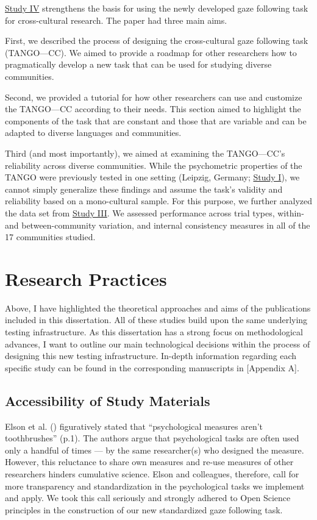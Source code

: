 \documentclass[
]{scrbook}
\begin{document}
\hyperref[studyIV]{Study IV} strengthens the basis for using the newly developed gaze following task for cross-cultural research. The paper had three main aims.

First, we described the process of designing the cross-cultural gaze following task (TANGO---CC). We aimed to provide a roadmap for other researchers how to pragmatically develop a new task that can be used for studying diverse communities.

Second, we provided a tutorial for how other researchers can use and customize the TANGO---CC according to their needs. This section aimed to highlight the components of the task that are constant and those that are variable and can be adapted to diverse languages and communities.

Third (and most importantly), we aimed at examining the TANGO---CC's reliability across diverse communities. While the psychometric properties of the TANGO were previously tested in one setting (Leipzig, Germany; \hyperref[studyI]{Study I}), we cannot simply generalize these findings and assume the task's validity and reliability based on a mono-cultural sample. For this purpose, we further analyzed the data set from \hyperref[studyIII]{Study III}. We assessed performance across trial types, within- and between-community variation, and internal consistency measures in all of the 17 communities studied.

\section{Research Practices}\label{research-practices}

Above, I have highlighted the theoretical approaches and aims of the publications included in this dissertation. All of these studies build upon the same underlying testing infrastructure. As this dissertation has a strong focus on methodological advances, I want to outline our main technological decisions within the process of designing this new testing infrastructure. In-depth information regarding each specific study can be found in the corresponding manuscripts in {[}Appendix A{]}.

\subsection{Accessibility of Study Materials}\label{accessibility-of-study-materials}

Elson et al. () figuratively stated that ``psychological measures aren't toothbrushes'' (p.1). The authors argue that psychological tasks are often used only a handful of times --- by the same researcher(s) who designed the measure. However, this reluctance to share own measures and re-use measures of other researchers hinders cumulative science. Elson and colleagues, therefore, call for more transparency and standardization in the psychological tasks we implement and apply. We took this call seriously and strongly adhered to Open Science principles in the construction of our new standardized gaze following task.
\end{document}
